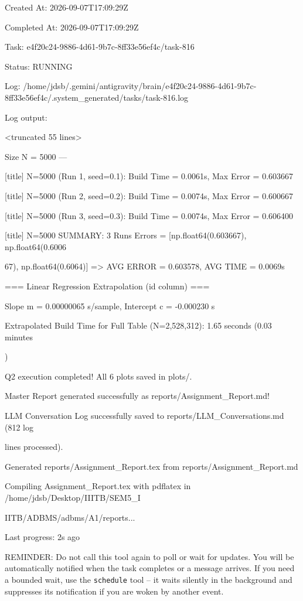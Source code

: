 \documentclass[11pt,a4paper]{article}
\begin{document}
Created At: 2026-09-07T17:09:29Z

Completed At: 2026-09-07T17:09:29Z

Task: e4f20c24-9886-4d61-9b7c-8ff33e56ef4c/task-816

Status: RUNNING

Log: /home/jdsb/.gemini/antigravity/brain/e4f20c24-9886-4d61-9b7c-8ff33e56ef4c/.system\_generated/tasks/task-816.log

Log output:

<truncated 55 lines>

Size N = 5000 ---

[title] N=5000 (Run 1, seed=0.1): Build Time = 0.0061s, Max Error = 0.603667

[title] N=5000 (Run 2, seed=0.2): Build Time = 0.0074s, Max Error = 0.600667

[title] N=5000 (Run 3, seed=0.3): Build Time = 0.0074s, Max Error = 0.606400

[title] N=5000 SUMMARY: 3 Runs Errors = [np.float64(0.603667), np.float64(0.6006

67), np.float64(0.6064)] => AVG ERROR = 0.603578, AVG TIME = 0.0069s

=== Linear Regression Extrapolation (id column) ===

Slope m = 0.00000065 s/sample, Intercept c = -0.000230 s

Extrapolated Build Time for Full Table (N=2,528,312): 1.65 seconds (0.03 minutes

)

Q2 execution completed! All 6 plots saved in plots/.

Master Report generated successfully as reports/Assignment\_Report.md!

LLM Conversation Log successfully saved to reports/LLM\_Conversations.md (812 log

lines processed).

Generated reports/Assignment\_Report.tex from reports/Assignment\_Report.md

Compiling Assignment\_Report.tex with pdflatex in /home/jdsb/Desktop/IIITB/SEM5\_I

IITB/ADBMS/adbms/A1/reports...


Last progress: 2s ago



REMINDER: Do not call this tool again to poll or wait for updates. You will be automatically notified when the task completes or a message arrives. If you need a bounded wait, use the \texttt{schedule} tool -- it waits silently in the background and suppresses its notification if you are woken by another event.
\end{document}
